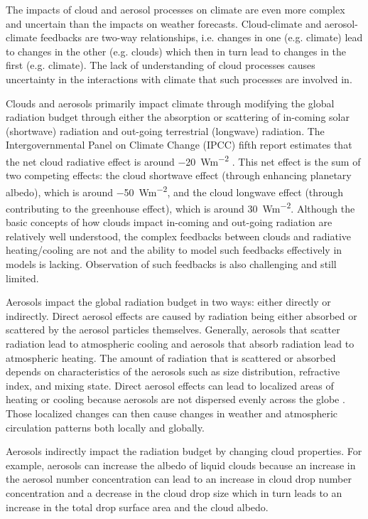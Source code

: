 The impacts of cloud and aerosol processes on climate are even more complex and uncertain than the impacts on weather forecasts. Cloud-climate and aerosol-climate feedbacks are two-way relationships, i.e. changes in one (e.g. climate) lead to changes in the other (e.g. clouds) which then in turn lead to changes in the first (e.g. climate). The lack of understanding of cloud processes causes uncertainty in the interactions with climate that such processes are involved in. \citep{ipcc5,mcfa2017,milt2018-2}

Clouds and aerosols primarily impact climate through modifying the global radiation budget through either the absorption or scattering of in-coming solar (shortwave) radiation and out-going terrestrial (longwave) radiation. The Intergovernmental Panel on Climate Change (IPCC) fifth report estimates that the net cloud radiative effect is around \SI{-20}{Wm^{-2}} \citep{ipcc5}. This net effect is the sum of two competing effects: the cloud shortwave effect (through enhancing planetary albedo), which is around \SI{-50}{Wm^{-2}}, and the cloud longwave effect (through contributing to the greenhouse effect), which is around \SI{+30}{Wm^{-2}}. Although the basic concepts of how clouds impact in-coming and out-going radiation are relatively well understood, the complex feedbacks between clouds and radiative heating/cooling are not and the ability to model such feedbacks effectively in models is lacking. Observation of such feedbacks is also challenging and still limited.

Aerosols impact the global radiation budget in two ways: either directly or indirectly. Direct aerosol effects are caused by radiation being either absorbed or scattered by the aerosol particles themselves. Generally, aerosols that scatter radiation lead to atmospheric cooling and aerosols that absorb radiation lead to atmospheric heating. The amount of radiation that is scattered or absorbed depends on characteristics of the aerosols such as size distribution, refractive index, and mixing state. \citep{ipcc5,bouc2015} Direct aerosol effects can lead to localized areas of heating or cooling because aerosols are not dispersed evenly across the globe \citep{bouc2015}. Those localized changes can then cause changes in weather and atmospheric circulation patterns both locally and globally. \citep{ipcc5}

Aerosols indirectly impact the radiation budget by changing cloud properties. For example, aerosols can increase the albedo of liquid clouds because an increase in the aerosol number concentration can lead to an increase in cloud drop number concentration and a decrease in the cloud drop size which in turn leads to an increase in the total drop surface area and the cloud albedo.

